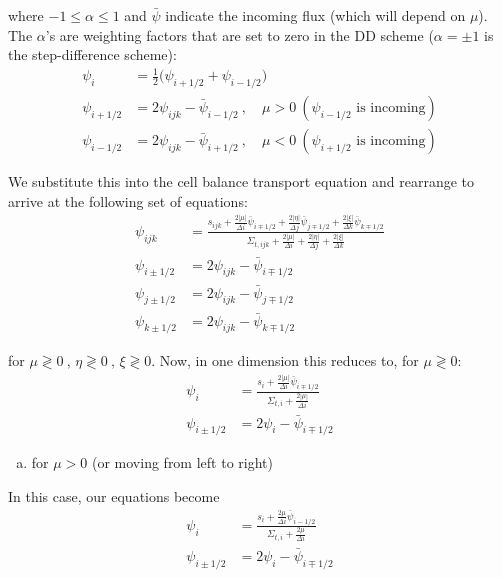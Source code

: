 \documentclass[10pt]{article}
\begin{document}
where $-1 \leq \alpha \leq 1$ and $\bar{\psi}$ indicate the incoming flux (which will depend on $\mu$). The $\alpha$'s are weighting factors that are set to zero in the DD scheme ($\alpha = \pm 1$ is the step-difference scheme):
%
\begin{align*}
\psi_{i} &= \frac{1}{2}\bigl(\psi_{i+1/2}+\psi_{i-1/2}\bigr)\\
\psi_{i+1/2} &= 2\psi_{ijk} - \bar{\psi}_{i-1/2}\:,\quad \mu>0\:(\psi_{i-1/2}\text{ is incoming})\\
\psi_{i-1/2} &= 2\psi_{ijk} - \bar{\psi}_{i+1/2}\:,\quad \mu<0 \:(\psi_{i+1/2}\text{ is incoming})
\end{align*}

We substitute this into the cell balance transport equation and rearrange to arrive at the following set of equations:
%
\begin{align*}
    \psi_{ijk} &= \frac{s_{ijk} +
      \frac{2|\mu|}{\Delta i}\bar{\psi}_{i\mp1/2} +
      \frac{2|\eta|}{\Delta j}\bar{\psi}_{j\mp1/2} +
      \frac{2|\xi|}{\Delta k}\bar{\psi}_{k\mp1/2}}{
      \Sigma_{t,ijk} + \frac{2|\mu|}{\Delta i} +
      \frac{2|\eta|}{\Delta j} +
      \frac{2|\xi|}{\Delta k} }\\
    \psi_{i\pm1/2} &= 2\psi_{ijk} - \bar{\psi}_{i\mp1/2}\\
    \psi_{j\pm1/2} &= 2\psi_{ijk} - \bar{\psi}_{j\mp1/2}\\
    \psi_{k\pm1/2} &= 2\psi_{ijk} - \bar{\psi}_{k\mp1/2}
\end{align*}

for $\mu\gtrless0\:,\,\eta\gtrless0\:,\,\xi\gtrless0$. Now, in one dimension this reduces to, for $\mu\gtrless0$:
%
\begin{align*}
    \psi_{i} &= \frac{s_{i} + \frac{2|\mu|}{\Delta i}\bar{\psi}_{i\mp1/2}}{\Sigma_{t,i} + \frac{2|\mu|}{\Delta i}} \\
    \psi_{i\pm1/2} &= 2\psi_{i} - \bar{\psi}_{i\mp1/2}
\end{align*}



\vspace{10pt}
%
\begin{enumerate}[(a)]
\item for $\mu > 0$ (or moving from left to right)
\end{enumerate}

In this case, our equations become
%
\begin{align*}
\psi_{i} &= \frac{s_{i} + \frac{2\mu}{\Delta i}\bar{\psi}_{i-1/2}}{\Sigma_{t,i} + \frac{2\mu}{\Delta i}} \\
\psi_{i\pm1/2} &= 2\psi_{i} - \bar{\psi}_{i\mp1/2}
\end{align*}
\end{document}
